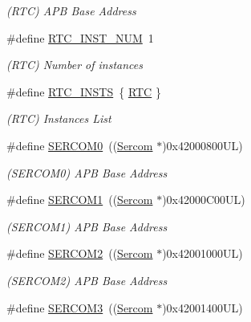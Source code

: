 \begin{DoxyCompactItemize}
\begin{DoxyCompactList}\small\item\em (R\+TC) A\+PB Base Address \end{DoxyCompactList}\item 
\#define \mbox{\hyperlink{group___s_a_m_d21_g15_l__base_gaa60e91b52e1886f06e68901250d0f7ff}{R\+T\+C\+\_\+\+I\+N\+S\+T\+\_\+\+N\+UM}}~1
\begin{DoxyCompactList}\small\item\em (R\+TC) Number of instances \end{DoxyCompactList}\item 
\#define \mbox{\hyperlink{group___s_a_m_d21_g15_l__base_gadf318081bc13d8cc65280fb772db8ba7}{R\+T\+C\+\_\+\+I\+N\+S\+TS}}~\{ \mbox{\hyperlink{group___s_a_m_d21_j18_a__base_ga5359a088f5d8b20ce74d920e46059304}{R\+TC}} \}
\begin{DoxyCompactList}\small\item\em (R\+TC) Instances List \end{DoxyCompactList}\item 
\#define \mbox{\hyperlink{group___s_a_m_d21_g15_l__base_gae5473788457bad0e69ad9d7f22ed404f}{S\+E\+R\+C\+O\+M0}}~((\mbox{\hyperlink{union_sercom}{Sercom}}   $\ast$)0x42000800\+U\+L)
\begin{DoxyCompactList}\small\item\em (S\+E\+R\+C\+O\+M0) A\+PB Base Address \end{DoxyCompactList}\item 
\#define \mbox{\hyperlink{group___s_a_m_d21_g15_l__base_ga130d7d7bc9ef1da1ba1bd094b42449d7}{S\+E\+R\+C\+O\+M1}}~((\mbox{\hyperlink{union_sercom}{Sercom}}   $\ast$)0x42000\+C00\+U\+L)
\begin{DoxyCompactList}\small\item\em (S\+E\+R\+C\+O\+M1) A\+PB Base Address \end{DoxyCompactList}\item 
\#define \mbox{\hyperlink{group___s_a_m_d21_g15_l__base_ga918e4c85993961a115bb23b4bb73a87f}{S\+E\+R\+C\+O\+M2}}~((\mbox{\hyperlink{union_sercom}{Sercom}}   $\ast$)0x42001000\+U\+L)
\begin{DoxyCompactList}\small\item\em (S\+E\+R\+C\+O\+M2) A\+PB Base Address \end{DoxyCompactList}\item 
\#define \mbox{\hyperlink{group___s_a_m_d21_g15_l__base_gac9f8240be5a40b46cb09617323ebc7e3}{S\+E\+R\+C\+O\+M3}}~((\mbox{\hyperlink{union_sercom}{Sercom}}   $\ast$)0x42001400\+U\+L)

\end{DoxyCompactItemize}
